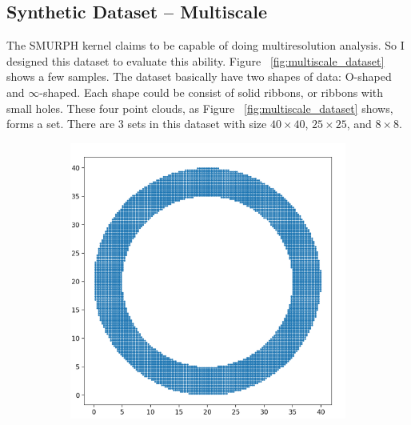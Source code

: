 \documentclass[10pt]{article}
\begin{document}
\subsection{Synthetic Dataset -- Multiscale}
The SMURPH kernel claims to be capable of doing multiresolution analysis.
So I designed this dataset to evaluate this ability.
Figure ~\ref{fig:multiscale_dataset} shows a few samples.
The dataset basically have two shapes of data: O-shaped and $\infty$-shaped.
Each shape could be consist of solid ribbons, or ribbons with small holes.
These four point clouds, as Figure ~\ref{fig:multiscale_dataset} shows, forms a set.
There are 3 sets in this dataset with size $40 \times 40$, $25 \times 25$, and $8 \times 8$.

\begin{figure}[H]
    \centering
    \begin{subfigure}[h]{0.2\textwidth}
        \includegraphics[width=\linewidth]{ms_1}
    \end{subfigure}
    \begin{subfigure}[h]{0.2\textwidth}

\end{subfigure}
\end{figure}
\end{document}
